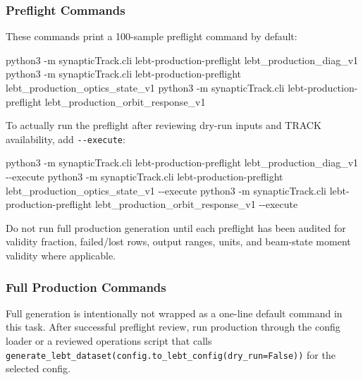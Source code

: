 \documentclass[
]{article}
\newenvironment{Shaded}{}{}
\newcommand{\AttributeTok}[1]{\textcolor[rgb]{0.49,0.56,0.16}{#1}}
\newcommand{\ExtensionTok}[1]{#1}
\newcommand{\NormalTok}[1]{#1}
\begin{document}
\hypertarget{preflight-commands}{%
\subsubsection{Preflight Commands}\label{preflight-commands}}

These commands print a 100-sample preflight command by default:

\begin{Shaded}
\begin{Highlighting}[]
\ExtensionTok{python3} \AttributeTok{{-}m}\NormalTok{ synapticTrack.cli lebt{-}production{-}preflight lebt\_production\_diag\_v1}
\ExtensionTok{python3} \AttributeTok{{-}m}\NormalTok{ synapticTrack.cli lebt{-}production{-}preflight lebt\_production\_optics\_state\_v1}
\ExtensionTok{python3} \AttributeTok{{-}m}\NormalTok{ synapticTrack.cli lebt{-}production{-}preflight lebt\_production\_orbit\_response\_v1}
\end{Highlighting}
\end{Shaded}

To actually run the preflight after reviewing dry-run inputs and TRACK
availability, add \texttt{-\/-execute}:

\begin{Shaded}
\begin{Highlighting}[]
\ExtensionTok{python3} \AttributeTok{{-}m}\NormalTok{ synapticTrack.cli lebt{-}production{-}preflight lebt\_production\_diag\_v1 }\AttributeTok{{-}{-}execute}
\ExtensionTok{python3} \AttributeTok{{-}m}\NormalTok{ synapticTrack.cli lebt{-}production{-}preflight lebt\_production\_optics\_state\_v1 }\AttributeTok{{-}{-}execute}
\ExtensionTok{python3} \AttributeTok{{-}m}\NormalTok{ synapticTrack.cli lebt{-}production{-}preflight lebt\_production\_orbit\_response\_v1 }\AttributeTok{{-}{-}execute}
\end{Highlighting}
\end{Shaded}

Do not run full production generation until each preflight has been
audited for validity fraction, failed/lost rows, output ranges, units,
and beam-state moment validity where applicable.

\hypertarget{full-production-commands}{%
\subsubsection{Full Production
Commands}\label{full-production-commands}}

Full generation is intentionally not wrapped as a one-line default
command in this task. After successful preflight review, run production
through the config loader or a reviewed operations script that calls
\texttt{generate\_lebt\_dataset(config.to\_lebt\_config(dry\_run=False))}
for the selected config.
\end{document}
